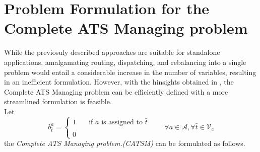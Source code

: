 \section{Problem Formulation for the Complete ATS Managing problem}\label{sec:catsm}
While the previosuly described approaches are suitable for standalone applications, amalgamating routing, dispatching, and rebalancing into a single problem would entail a considerable increase in the number of variables, resulting in an inefficient formulation. However, with the hinsights obtained in , the  Complete ATS Managing problem can be efficiently defined with a more streamlined formulation is feasible. \\
Let 
\begin{equation*}
	b_{\bar{t}}^a = 
	\begin{cases} 
		1 & \quad \text{if $a$ is assigned to }\bar{t} \\
		\\
		0
	\end{cases}
	\quad\quad \forall a \in \mathcal{A}, \forall \bar{t} \in \mathcal{V}_c
	\label{eq:assignment}
\end{equation*}
the \textit{Complete ATS Managing problem.(CATSM)} can be formulated as follows. \\

